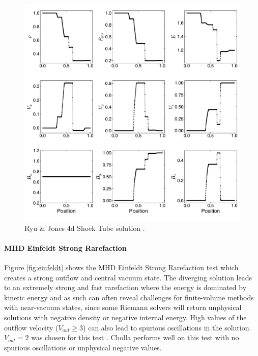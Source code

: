 \documentclass[modern, linenumbers]{aastex631}
\newcommand*{\img}[1]{%
    \raisebox{-.05\baselineskip}{%
        \texttt{[image: \#1]}%
    }%
}
\begin{document}
\begin{figure}[ht!]
    \includegraphics[width=\linewidth]{rj4d.pdf}
    \caption{Ryu \& Jones 4d Shock Tube solution \citep{ryu_jones_1995}.
    \href{https://zenodo.org/records/10927223}{\img{zenodo-gradient-200.png}}}
    \label{fig:rj-4d}
\end{figure}

\paragraph{MHD Einfeldt Strong Rarefaction}
Figure \ref{fig:einfeldt} shows the MHD Einfeldt Strong Rarefaction test \citep{einfeldt_1991} which creates a strong outflow and central vacuum state. The diverging solution leads to an extremely strong and fast rarefaction where the energy is dominated by kinetic energy and as such can often reveal challenges for finite-volume methods with near-vacuum states, since some Riemann solvers will return unphysical solutions with negative density or negative internal energy. High values of the outflow velocity ($V_{out}\ge3$) can also lead to spurious oscillations in the solution. $V_{out} = 2$ was chosen for this test \citep{charm_2011}. Cholla performs well on this test with no spurious oscillations or unphysical negative values.
\end{document}
